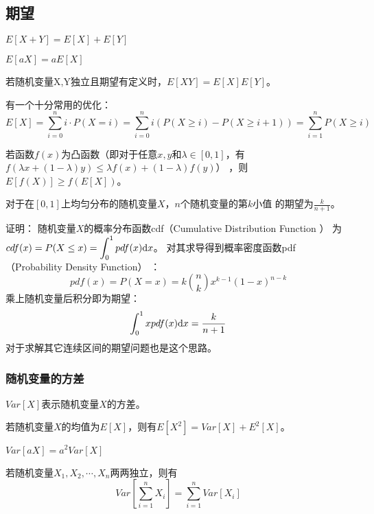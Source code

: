 \subsection{期望}
\begin{theorem}[期望的线性性质]
    $E[X+Y]=E[X]+E[Y]$
\end{theorem}
\begin{theorem}
    $E[aX]=aE[X]$
\end{theorem}
\begin{theorem}
    若随机变量X,Y独立且期望有定义时，$E[XY]=E[X]E[Y]$。
\end{theorem}
有一个十分常用的优化：
\begin{displaymath}
    E[X]=\sum_{i=0}^n{i\cdot P(X=i)}
    =\sum_{i=0}^n{i(P(X\geq i)-P(X\geq i+1))}
    =\sum_{i=1}^n{P(X\geq i)}
\end{displaymath}
\begin{theorem}
    若函数$f(x)$为凸函数（即对于任意$x,y$和$\lambda\in [0,1]$，有
    $f(\lambda x+(1-\lambda)y)\leq\lambda f(x)+(1-\lambda)f(y)$）
    ，则$E[f(X)]\geq f(E[X])$。
\end{theorem}
\begin{theorem}
    对于在$[0,1]$上均匀分布的随机变量$X$，$n$个随机变量的第$k$小值
    的期望为$\frac{k}{n+1}$。
\end{theorem}
证明：
随机变量$X$的概率分布函数cdf（Cumulative Distribution Function
）
为$\displaystyle cdf(x)=P(X\leq x)=\int_0^1{pdf(x)\mathrm{d} x}$。
对其求导得到概率密度函数pdf（Probability Density Function）
：
\begin{displaymath}
    pdf(x)=P(X=x)=k{n \choose k}x^{k-1}(1-x)^{n-k}
\end{displaymath}
乘上随机变量后积分即为期望：
\begin{displaymath}
    \int_0^1{xpdf(x)\mathrm{d} x}=\frac{k}{n+1}
\end{displaymath}
对于求解其它连续区间的期望问题也是这个思路。
\subsubsection{随机变量的方差}
$Var[X]$表示随机变量$X$的方差。
\begin{theorem}
    若随机变量$X$的均值为$E[X]$，则有$E[X^2]=Var[X]+E^2[X]$。
\end{theorem}
\begin{theorem}
    $Var[aX]=a^2Var[X]$
\end{theorem}
\begin{theorem}
    若随机变量$X_1,X_2,\cdots,X_n$两两独立，则有
    \begin{displaymath}
        Var[\sum_{i=1}^n{X_i}]=\sum_{i=1}^n{Var[X_i]}
    \end{displaymath}
\end{theorem}
